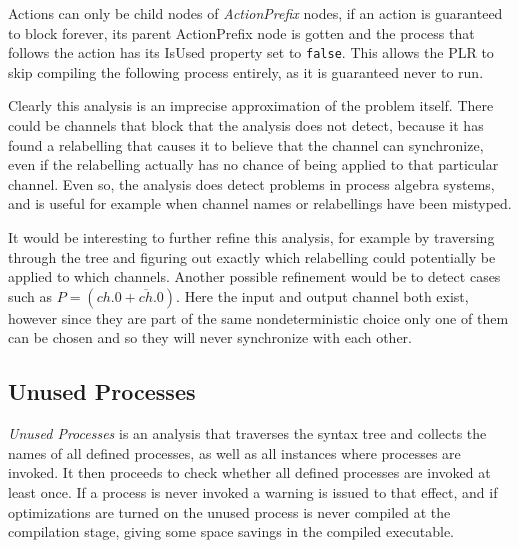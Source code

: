 	Actions can only be child nodes of \textit{ActionPrefix} nodes, if an 
	action is guaranteed to block forever, its parent \textsf{ActionPrefix}
	node is gotten and the process that follows the action has its 
	\textsf{IsUsed} property set to \texttt{false}. This allows the PLR to skip
	compiling the following process entirely, as it is guaranteed never to run.
	 
	Clearly this analysis is an imprecise approximation of the problem itself. 
	There could be channels that block that the analysis does not detect, because
	it has found a relabelling that causes it to believe that the channel can 
	synchronize, even if the relabelling actually has no chance of being applied
	to that particular channel. Even so, the analysis does detect problems in
	process algebra systems, and is useful for example when channel names or
	relabellings have been mistyped.
	
	It would be interesting to further refine this analysis, for example by 
	traversing through the tree and figuring out exactly which relabelling
	could potentially be applied to which channels. Another possible refinement
	would be to detect cases such as $P = (ch.0+\overline{ch}.0)$. Here the
	input and output channel both exist, however since they are part of the
	same nondeterministic choice only one of them can be chosen and so they
	will never synchronize with each other.

\subsection{Unused Processes}

	\textit{Unused Processes} is an analysis that traverses the syntax tree and
	collects the names of all defined processes, as well as all instances where
	processes are invoked. It then proceeds to check whether all defined 
	processes are invoked at least once. If a process is never invoked a warning 
	is issued to that effect, and if optimizations are turned on the unused 
	process is never compiled at the compilation stage, giving some space 
	savings in the compiled executable.

	


	